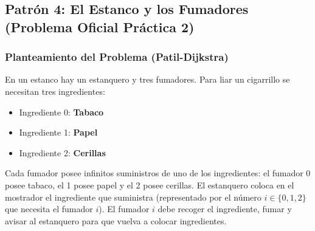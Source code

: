 \subsection{Patrón 4: El Estanco y los Fumadores (Problema Oficial Práctica 2)}

\subsubsection{Planteamiento del Problema (Patil-Dijkstra)}
En un estanco hay un estanquero y tres fumadores. Para liar un cigarrillo se necesitan tres ingredientes:
\begin{itemize}[leftmargin=*]
    \item Ingrediente 0: \textbf{Tabaco}
    \item Ingrediente 1: \textbf{Papel}
    \item Ingrediente 2: \textbf{Cerillas}
\end{itemize}
Cada fumador posee infinitos suministros de uno de los ingredientes: el fumador 0 posee tabaco, el 1 posee papel y el 2 posee cerillas.
El estanquero coloca en el mostrador el ingrediente que suministra (representado por el número $i \in \{0, 1, 2\}$ que necesita el fumador $i$). El fumador $i$ debe recoger el ingrediente, fumar y avisar al estanquero para que vuelva a colocar ingredientes.

